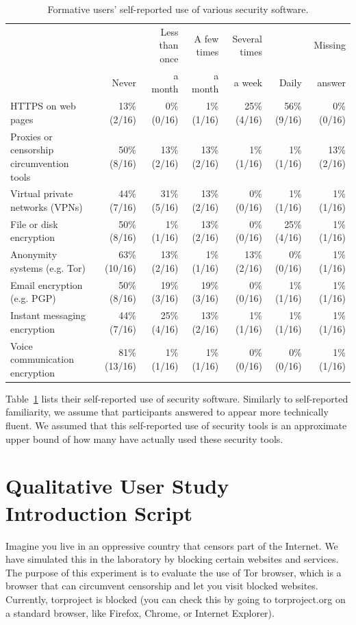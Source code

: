 \documentclass[USenglish,oneside,twocolumn]{article}
\begin{document}
\begin{table}[h]
\centering
\begin{tabular}{l r r r r r r}
& \multicolumn{1}{r}{} & \multicolumn{1}{r}{Less than once} & \multicolumn{1}{r}{A few times}& \multicolumn{1}{r}{Several times}& \multicolumn{1}{r}{} & \multicolumn{1}{r}{Missing}\\
& \multicolumn{1}{r}{Never} & \multicolumn{1}{r}{a month} & \multicolumn{1}{r}{a month}& \multicolumn{1}{r}{a week}& \multicolumn{1}{r}{Daily} & \multicolumn{1}{r}{answer}\\
\noalign{\hrule}
HTTPS on web pages				& 13\% (2/16) & 0\% (0/16) & 1\% (1/16) & 25\% (4/16) & 56\% (9/16) & 0\% (0/16) \\
Proxies or censorship circumvention tools & 50\% (8/16) & 13\% (2/16) & 13\% (2/16) & 1\% (1/16) & 1\% (1/16) & 13\% (2/16) \\
Virtual private networks (VPNs) 		& 44\% (7/16) & 31\% (5/16) & 13\% (2/16) & 0\% (0/16) & 1\% (1/16) & 1\% (1/16) \\
File or disk encryption 				& 50\% (8/16) & 1\% (1/16) & 13\% (2/16) & 0\% (0/16) & 25\% (4/16) & 1\% (1/16) \\
Anonymity systems (e.g. Tor) 			& 63\% (10/16) & 13\% (2/16) & 1\% (1/16) & 13\% (2/16) & 0\% (0/16) & 1\% (1/16) \\
Email encryption (e.g. PGP) 			& 50\% (8/16) & 19\% (3/16) & 19\% (3/16) & 0\% (0/16) & 1\% (1/16) & 1\% (1/16) \\
Instant messaging encryption 			& 44\% (7/16) & 25\% (4/16) & 13\% (2/16) & 1\% (1/16) & 1\% (1/16) & 1\% (1/16) \\
Voice communication encryption 		& 81\% (13/16) & 1\% (1/16) & 1\% (1/16) & 0\% (0/16) & 0\% (0/16) &1\% (1/16)\\
\end{tabular}
\caption{
Formative users' self-reported use of various security software. 
}
\label{table:selfreported-software}
\end{table}

Table~\ref{table:selfreported-software} lists their self-reported use of security software. Similarly to self-reported familiarity, we assume that participants answered to appear more technically fluent. We assumed that this self-reported use of security tools is an approximate upper bound of how many have actually used these security tools.

\section{Qualitative User Study Introduction Script} 
\label{qualitative-script} 
Imagine you live in an oppressive country that censors part of the Internet. We have simulated this in the laboratory by blocking certain websites and services.  The purpose of this experiment is to evaluate the use of Tor browser, which is a browser that can circumvent censorship and let you visit blocked websites. Currently, torproject is blocked (you can check this by going to torproject.org on a standard browser, like Firefox, Chrome, or Internet Explorer). 
\end{document}
